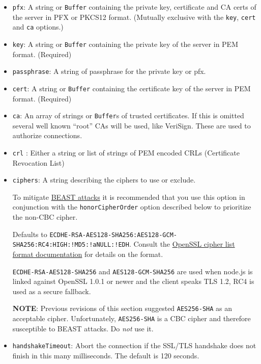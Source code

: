 \begin{itemize}
\item
  \texttt{pfx}: A string or \texttt{Buffer} containing the private key,
  certificate and CA certs of the server in PFX or PKCS12 format.
  (Mutually exclusive with the \texttt{key}, \texttt{cert} and
  \texttt{ca} options.)
\item
  \texttt{key}: A string or \texttt{Buffer} containing the private key
  of the server in PEM format. (Required)
\item
  \texttt{passphrase}: A string of passphrase for the private key or
  pfx.
\item
  \texttt{cert}: A string or \texttt{Buffer} containing the certificate
  key of the server in PEM format. (Required)
\item
  \texttt{ca}: An array of strings or \texttt{Buffer}s of trusted
  certificates. If this is omitted several well known ``root'' CAs will
  be used, like VeriSign. These are used to authorize connections.
\item
  \texttt{crl} : Either a string or list of strings of PEM encoded CRLs
  (Certificate Revocation List)
\item
  \texttt{ciphers}: A string describing the ciphers to use or exclude.

  To mitigate
  \href{http://blog.ivanristic.com/2011/10/mitigating-the-beast-attack-on-tls.html}{BEAST
  attacks} it is recommended that you use this option in conjunction
  with the \texttt{honorCipherOrder} option described below to
  prioritize the non-CBC cipher.

  Defaults to
  \texttt{ECDHE-RSA-AES128-SHA256:AES128-GCM-SHA256:RC4:HIGH:!MD5:!aNULL:!EDH}.
  Consult the
  \href{http://www.openssl.org/docs/apps/ciphers.html\#CIPHER\_LIST\_FORMAT}{OpenSSL
  cipher list format documentation} for details on the format.

  \texttt{ECDHE-RSA-AES128-SHA256} and \texttt{AES128-GCM-SHA256} are
  used when node.js is linked against OpenSSL 1.0.1 or newer and the
  client speaks TLS 1.2, RC4 is used as a secure fallback.

  \textbf{NOTE}: Previous revisions of this section suggested
  \texttt{AES256-SHA} as an acceptable cipher. Unfortunately,
  \texttt{AES256-SHA} is a CBC cipher and therefore susceptible to BEAST
  attacks. Do \emph{not} use it.
\item
  \texttt{handshakeTimeout}: Abort the connection if the SSL/TLS
  handshake does not finish in this many milliseconds. The default is
  120 seconds.


\end{itemize}

